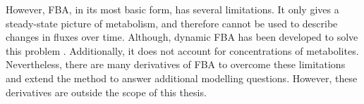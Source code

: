 
However, FBA, in its most basic form, has several limitations.
It only gives a steady-state picture of metabolism, and therefore cannot be used to describe changes in fluxes over time.
Although, dynamic FBA has been developed to solve this problem \parencite{mahadevanDynamicFluxBalance2002}.
Additionally, it does not account for concentrations of metabolites.
Nevertheless, there are many derivatives of FBA to overcome these limitations and extend the method to answer additional modelling questions.
However, these derivatives are outside the scope of this thesis.
